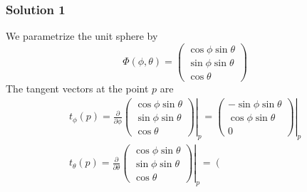 \documentclass[12pt, t]{beamer}
\begin{document}
\begin{frame}[allowframebreaks]
    \frametitle{Solution 1}
    We parametrize the unit sphere by
    \[
        \Phi(\phi, \theta)=\left(\begin{array}{c}
                \cos \phi \sin \theta \\
                \sin \phi \sin \theta \\
                \cos \theta
            \end{array}\right)
    \]
    The tangent vectors at the point $p$ are
    \[
        \begin{array}{l}
            t_{\phi}(p)=\left.\frac{\partial}{\partial \phi}\left(\begin{array}{c}
                                                                          \cos \phi \sin \theta \\
                                                                          \sin \phi \sin \theta \\
                                                                          \cos \theta
                                                                      \end{array}\right)\right|_{p}=\left.\left(\begin{array}{c}
                                                                                                                    -\sin \phi \sin \theta \\
                                                                                                                    \cos \phi \sin \theta  \\
                                                                                                                    0
                                                                                                                \end{array}\right)\right|_{p} \\
            t_{\theta}(p)=\left.\frac{\partial}{\partial \theta}\left(\begin{array}{c}
                                                                              \cos \phi \sin \theta \\
                                                                              \sin \phi \sin \theta \\
                                                                              \cos \theta
                                                                          \end{array}\right)\right|_{p}=\left.\left(\begin{array}{c}

\end{array}
\end{array}\]
\end{frame}
\end{document}
